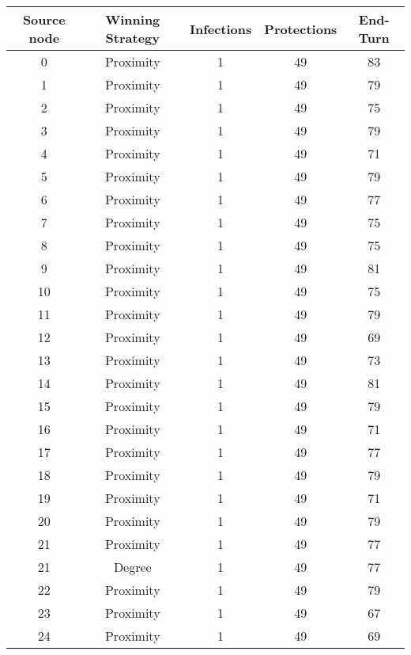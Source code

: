 \documentclass[results.tex]{subfiles}
\begin{document}
\begin{center}
  \begin{tabular}{| c || c | c | c | c |}
    \hline
    {\bfseries Source node} & {\bfseries Winning Strategy} & {\bfseries Infections} & {\bfseries Protections} & {\bfseries End-Turn} \\  %
    \hline\hline
    0 & Proximity & 1 & 49 & 83 \\ 
    \hline
    1 & Proximity & 1 & 49 & 79 \\ 
    \hline
    2 & Proximity & 1 & 49 & 75 \\ 
    \hline
    3 & Proximity & 1 & 49 & 79 \\ 
    \hline
    4 & Proximity & 1 & 49 & 71 \\ 
    \hline
    5 & Proximity & 1 & 49 & 79 \\ 
    \hline
    6 & Proximity & 1 & 49 & 77 \\ 
    \hline
    7 & Proximity & 1 & 49 & 75 \\ 
    \hline
    8 & Proximity & 1 & 49 & 75 \\ 
    \hline
    9 & Proximity & 1 & 49 & 81 \\ 
    \hline
    10 & Proximity & 1 & 49 & 75 \\ 
    \hline
    11 & Proximity & 1 & 49 & 79 \\ 
    \hline
    12 & Proximity & 1 & 49 & 69 \\ 
    \hline
    13 & Proximity & 1 & 49 & 73 \\ 
    \hline
    14 & Proximity & 1 & 49 & 81 \\ 
    \hline
    15 & Proximity & 1 & 49 & 79 \\ 
    \hline
    16 & Proximity & 1 & 49 & 71 \\ 
    \hline
    17 & Proximity & 1 & 49 & 77 \\ 
    \hline
    18 & Proximity & 1 & 49 & 79 \\ 
    \hline
    19 & Proximity & 1 & 49 & 71 \\ 
    \hline
    20 & Proximity & 1 & 49 & 79 \\ 
    \hline
    21 & Proximity & 1 & 49 & 77 \\ 
    \hline
    21 & Degree & 1 & 49 & 77 \\ 
    \hline
    22 & Proximity & 1 & 49 & 79 \\ 
    \hline
    23 & Proximity & 1 & 49 & 67 \\ 
    \hline
    24 & Proximity & 1 & 49 & 69 \\ 

\end{tabular}
\end{center}
\end{document}
